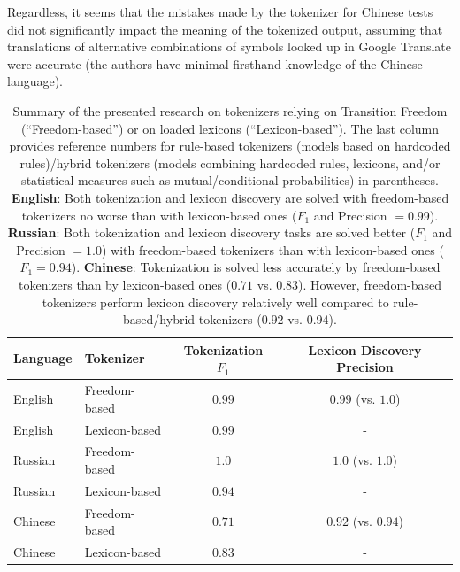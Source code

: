 \documentclass[11pt]{article}
\begin{document}
Regardless, it seems that the mistakes made by the tokenizer for Chinese tests did not significantly impact the meaning of the tokenized output, assuming that translations of alternative combinations of symbols looked up in Google Translate were accurate (the authors have minimal firsthand knowledge of the Chinese language).

\begin{table}
\centering
\begin{tabular}{llcc}
\hline
\textbf{Language}&\textbf{Tokenizer} &\textbf{Tokenization $F_1$} &\textbf{Lexicon Discovery Precision}\\
\hline
English & Freedom-based & \textbf{$\mathbf{0.99}$} & \textbf{$\mathbf{0.99}$} (vs. $1.0$)\\
English  & Lexicon-based & $0.99$ & -\\
Russian  & Freedom-based & \textbf{$\mathbf{1.0}$} & \textbf{$\mathbf{1.0}$} (vs. $1.0$)\\
Russian  & Lexicon-based & $0.94$ & -\\
Chinese  & Freedom-based & \textbf{$\mathbf{0.71}$} & \textbf{$\mathbf{0.92}$} (vs. $0.94$)\\
Chinese  & Lexicon-based & $0.83$ & -\\
\hline
\end{tabular}
\caption{\label{table}Summary of the presented research on tokenizers relying on Transition Freedom (“Freedom-based”) or on loaded lexicons (“Lexicon-based”). The last column provides reference numbers for rule-based tokenizers (models based on hardcoded rules)/hybrid tokenizers (models combining hardcoded rules, lexicons, and/or statistical measures such as mutual/conditional probabilities) in parentheses. \textbf{English}: Both tokenization and lexicon discovery are solved with freedom-based tokenizers no worse than with lexicon-based ones ($F_1$ and Precision $=0.99$). \textbf{Russian}: Both tokenization and lexicon discovery tasks are solved better ($F_1$ and Precision $=1.0$) with freedom-based tokenizers than with lexicon-based ones ($F_1=0.94$). \textbf{Chinese}: Tokenization is solved less accurately by freedom-based tokenizers than by lexicon-based ones ($0.71$ vs. $0.83$). However, freedom-based tokenizers perform lexicon discovery relatively well compared to rule-based/hybrid tokenizers ($0.92$ vs. $0.94$).}
\end{table}
\end{document}
